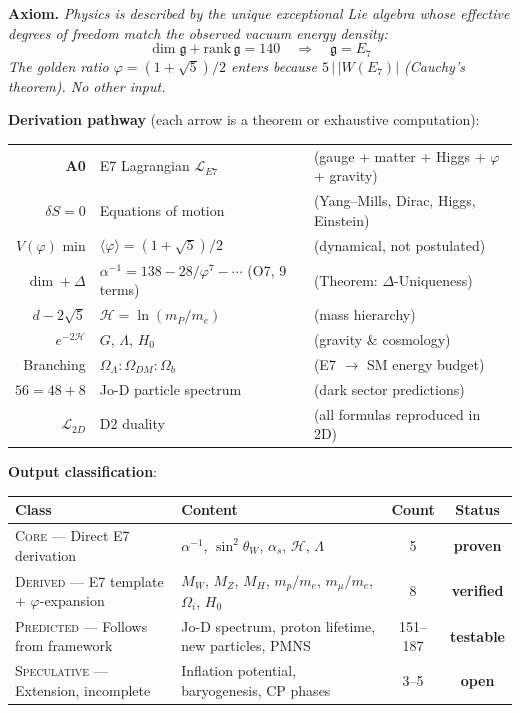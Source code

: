 \documentclass[11pt,a4paper]{article}
\begin{document}
\noindent\textbf{Axiom.} \textit{Physics is described by the unique exceptional Lie algebra whose effective degrees of freedom match the observed vacuum energy density:}
\begin{equation}
\boxed{\dim\mathfrak{g} + \text{rank}\,\mathfrak{g} = 140 \quad \Longrightarrow \quad \mathfrak{g} = E_7}
\tag{A0}
\end{equation}
\textit{The golden ratio $\varphi = (1+\sqrt{5})/2$ enters because $5 \,|\, |W(E_7)|$ (Cauchy's theorem). No other input.}

\medskip
\noindent\textbf{Derivation pathway} (each arrow is a theorem or exhaustive computation):

\smallskip
\begin{center}
\begin{tabular}{r@{$\;\longrightarrow\;$}l@{\qquad}l}
\textbf{A0} & E7 Lagrangian $\mathcal{L}_{E7}$ & (gauge + matter + Higgs + $\varphi$ + gravity) \\
$\delta S = 0$ & Equations of motion & (Yang--Mills, Dirac, Higgs, Einstein) \\
$V(\varphi)$ min & $\langle\varphi\rangle = (1{+}\sqrt{5})/2$ & (dynamical, not postulated) \\
$\dim + \Delta$ & $\alpha^{-1} = 138 - 28/\varphi^7 - \cdots$ (O7, 9 terms) & (Theorem: $\Delta$-Uniqueness) \\
$d - 2\sqrt{5}$ & $\mathcal{H} = \ln(m_P/m_e)$ & (mass hierarchy) \\
$e^{-2\mathcal{H}}$ & $G$, $\Lambda$, $H_0$ & (gravity \& cosmology) \\
Branching & $\Omega_\Lambda : \Omega_{DM} : \Omega_b$ & (E7 $\to$ SM energy budget) \\
$56 = 48 + 8$ & Jo-D particle spectrum & (dark sector predictions) \\
$\mathcal{L}_{2D}$ & D2 duality & (all formulas reproduced in 2D) \\
\end{tabular}
\end{center}

\medskip
\noindent\textbf{Output classification}:

\smallskip
\begin{center}
\begin{tabular}{|l|l|c|c|}
\hline
\textbf{Class} & \textbf{Content} & \textbf{Count} & \textbf{Status} \\
\hline
\textsc{Core} --- Direct E7 derivation & $\alpha^{-1}$, $\sin^2\theta_W$, $\alpha_s$, $\mathcal{H}$, $\Lambda$ & 5 & \textbf{proven} \\
\textsc{Derived} --- E7 template + $\varphi$-expansion & $M_W$, $M_Z$, $M_H$, $m_p/m_e$, $m_\mu/m_e$, $\Omega_i$, $H_0$ & 8 & \textbf{verified} \\
\textsc{Predicted} --- Follows from framework & Jo-D spectrum, proton lifetime, new particles, PMNS & 151--187 & \textbf{testable} \\
\textsc{Speculative} --- Extension, incomplete & Inflation potential, baryogenesis, CP phases & 3--5 & \textbf{open} \\
\hline
\end{tabular}
\end{center}
\end{document}
